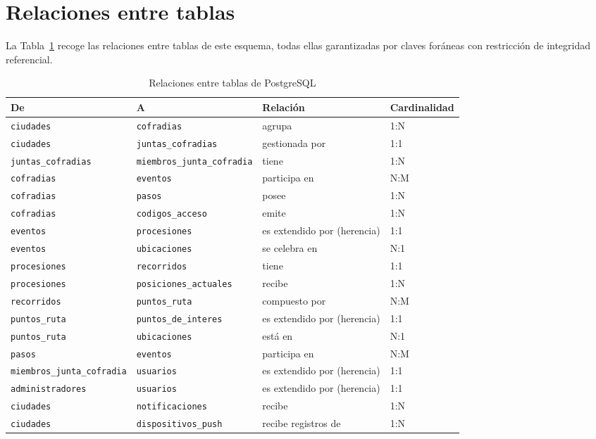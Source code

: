\section{Relaciones entre tablas}
La Tabla~\ref{tab:relacionesBD} recoge las relaciones entre tablas de este esquema, todas ellas garantizadas por claves foráneas con restricción de integridad referencial.
\begin{table}[H]
\centering
\begin{tabular}{|l|l|l|l|}
\hline
\textbf{De} & \textbf{A} & \textbf{Relación} & \textbf{Cardinalidad} \\
\hline
\texttt{ciudades} & \texttt{cofradias} & agrupa & 1:N \\
\hline
\texttt{ciudades} & \texttt{juntas\_cofradias} & gestionada por & 1:1 \\
\hline
\texttt{juntas\_cofradias} & \texttt{miembros\_junta\_cofradia} & tiene & 1:N \\
\hline
\texttt{cofradias} & \texttt{eventos} & participa en & N:M \\
\hline
\texttt{cofradias} & \texttt{pasos} & posee & 1:N \\
\hline
\texttt{cofradias} & \texttt{codigos\_acceso} & emite & 1:N \\
\hline
\texttt{eventos} & \texttt{procesiones} & es extendido por (herencia) & 1:1 \\
\hline
\texttt{eventos} & \texttt{ubicaciones} & se celebra en & N:1 \\
\hline
\texttt{procesiones} & \texttt{recorridos} & tiene & 1:1 \\
\hline
\texttt{procesiones} & \texttt{posiciones\_actuales} & recibe & 1:N \\
\hline
\texttt{recorridos} & \texttt{puntos\_ruta} & compuesto por & N:M \\
\hline
\texttt{puntos\_ruta} & \texttt{puntos\_de\_interes} & es extendido por (herencia) & 1:1 \\
\hline
\texttt{puntos\_ruta} & \texttt{ubicaciones} & está en & N:1 \\
\hline
\texttt{pasos} & \texttt{eventos} & participa en & N:M \\
\hline
\texttt{miembros\_junta\_cofradia} & \texttt{usuarios} & es extendido por (herencia) & 1:1 \\
\hline
\texttt{administradores} & \texttt{usuarios} & es extendido por (herencia) & 1:1 \\
\hline
\texttt{ciudades} & \texttt{notificaciones} & recibe & 1:N \\
\hline
\texttt{ciudades} & \texttt{dispositivos\_push} & recibe registros de & 1:N \\
\hline
\end{tabular}
\caption{Relaciones entre tablas de PostgreSQL}
\label{tab:relacionesBD}
\end{table}
